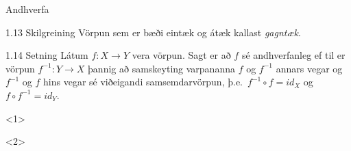 \documentclass[icelandic,a4paper,12pt]{article}
\begin{document}
\begin{frame}{Andhverfa}
 \begin{block}{1.13 Skilgreining}
  Vörpun sem er bæði eintæk og átæk kallast \emph{gagntæk}.
 \end{block}

 \pause
 
\begin{block}{1.14 Setning}
 Látum $f:X \to Y$ vera vörpun. Sagt er að 
$f$ sé andhverfanleg ef til er vörpun 
$f^{-1}:Y \to X$
þannig að samskeyting varpananna $f$ og 
$f^{-1}$ annars vegar og 
$f^{-1}$ og 
$f$ hins vegar sé viðeigandi 
samsemdarvörpun, þ.e.~$f^{-1}\circ f=id_X$ og
$f\circ f^{-1} = id_Y$.
\end{block}

{<1>}

\pause

{<2>}

\end{frame}
\end{document}
